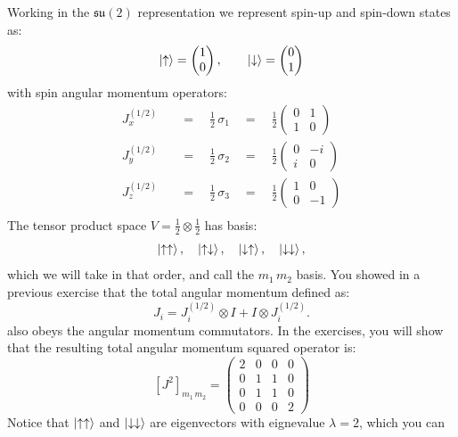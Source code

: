 \documentclass[12pt]{article}
\begin{document}
Working in the $\mathfrak{su}(2)$ representation we represent spin-up and spin-down states as:
$$\ket{\uparrow} = \begin{pmatrix}1\\0\end{pmatrix}, \quad \quad
  \ket{\downarrow} = \begin{pmatrix}0\\1\end{pmatrix}$$
with spin angular momentum operators:
\begin{align*}
  J_x^{(1/2)} \quad &= \quad \frac{1}{2} \, \sigma_1 \quad = \quad \frac{1}{2}\begin{pmatrix}0&1\\1&0\end{pmatrix} \\
  J_y^{(1/2)} \quad &= \quad \frac{1}{2} \, \sigma_2 \quad = \quad \frac{1}{2}\begin{pmatrix}0&-i\\i&0\end{pmatrix} \\
  J_z^{(1/2)} \quad &= \quad \frac{1}{2} \, \sigma_3 \quad = \quad \frac{1}{2}\begin{pmatrix}1&0\\0&-1\end{pmatrix} \\
\end{align*}
The tensor product space $V = \tfrac{1}{2} \otimes \tfrac{1}{2}$ has basis:
\begin{equation*}
  \ket{\uparrow\uparrow},\quad \ket{\uparrow\downarrow},\quad \ket{\downarrow\uparrow},\quad \ket{\downarrow\downarrow},
\end{equation*}
which we will take in that order, and call the $m_1\, m_2$ basis.
You showed in a previous exercise that the total angular momentum defined as:
\begin{equation*}
  J_i = J_i^{(1/2)} \otimes I + I \otimes J_i^{(1/2)}.
\end{equation*}
also obeys the angular momentum commutators.  In the exercises, you will show that the resulting total angular momentum squared operator is:
$$[J^2]_{m_1\, m_2} = \begin{pmatrix}2&0&0&0\\0&1&1&0\\0&1&1&0\\0&0&0&2\end{pmatrix}$$
Notice that $\ket{\uparrow\uparrow}$ and $\ket{\downarrow\downarrow}$
are eigenvectors with eignevalue $\lambda = 2$, which you can
\end{document}
